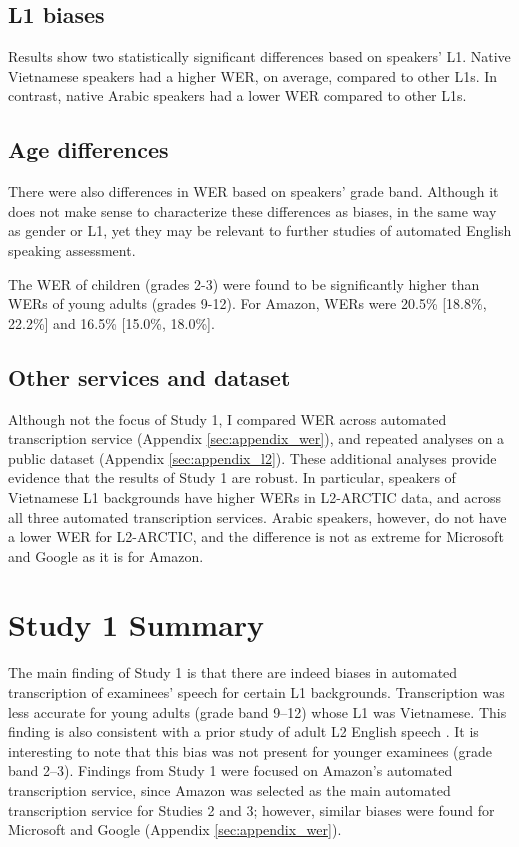 \documentclass [PhD] {uclathes}
\begin{document}
\subsection{L1 biases}

Results show two statistically significant differences based on speakers’ L1. Native Vietnamese speakers had a higher WER, on average, compared to other L1s. In contrast, native Arabic speakers had a lower WER compared to other L1s. 

\subsection{Age differences}

There were also differences in WER based on speakers' grade band. Although it does not make sense to characterize these differences as biases, in the same way as gender or L1, yet they may be relevant to further studies of automated English speaking assessment.

The WER of children (grades 2-3) were found to be significantly higher than WERs of young adults (grades 9-12). For Amazon, WERs were 20.5\% [18.8\%, 22.2\%] and 16.5\% [15.0\%, 18.0\%].

\subsection{Other services and dataset}

Although not the focus of Study 1, I compared WER across automated transcription service (Appendix \ref{sec:appendix_wer}), and repeated analyses on a public dataset (Appendix \ref{sec:appendix_l2}). These additional analyses provide evidence that the results of Study 1 are robust. In particular, speakers of Vietnamese L1 backgrounds have higher WERs in L2-ARCTIC data, and across all three automated transcription services. Arabic speakers, however, do not have a lower WER for L2-ARCTIC, and the difference is not as extreme for Microsoft and Google as it is for Amazon. 

\section{Study 1 Summary}

The main finding of Study 1 is that there are indeed biases in automated transcription of examinees’ speech for certain L1 backgrounds. Transcription was less accurate for young adults (grade band 9–12) whose L1 was Vietnamese. This finding is also consistent with a prior study of adult L2 English speech \citep{chan2022training}. It is interesting to note that this bias was not present for younger examinees (grade band 2–3). Findings from Study 1 were focused on Amazon’s automated transcription service, since Amazon was selected as the main automated transcription service for Studies 2 and 3; however, similar biases were found for Microsoft and Google (Appendix \ref{sec:appendix_wer}). 
\end{document}
